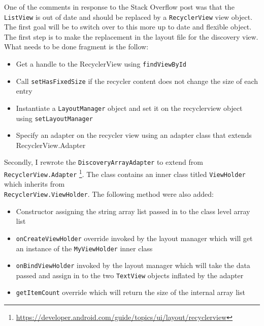 \documentclass[fontsize=11pt, %
                             paper=a4, %
                             twoside, %
                             captions=tableheading,
                             index=totoc,
                             hyperref]{labbook}
\begin{document}
\begin{addmargin}[0cm]{0cm}
One of the comments in response to the Stack Overflow post was that the \texttt{ListView} is out of date and should be replaced by a \texttt{RecyclerView} view object. The first goal will be to switch over to this more up to date and flexible object. The first step is to make the replacement in the layout file for the discovery view. What needs to be done fragment is the follow:
\begin{itemize}
\item Get a handle to the RecyclerView using \texttt{findViewById}
\item Call \texttt{setHasFixedSize} if the recycler content does not change the size of each entry
\item Instantiate a \texttt{LayoutManager} object and set it on the recyclerview object using \texttt{setLayoutManager}
\item Specify an adapter on the recycler view using an adapter class that extends RecyclerView.Adapter
\end{itemize}
Secondly, I rewrote the \texttt{DiscoveryArrayAdapter} to extend from \texttt{RecyclerView.Adapter} \footnote{\url{https://developer.android.com/guide/topics/ui/layout/recyclerview}}. The class contains an inner class titled \texttt{ViewHolder} which inherits from\\
\texttt{RecyclerView.ViewHolder}. The following method were also added:
\begin{itemize}
\item Constructor assigning the string array list passed in to the class level array list
\item \texttt{onCreateViewHolder} override invoked by the layout manager which will get an instance of the \texttt{MyViewHolder} inner class
\item \texttt{onBindViewHolder} invoked by the layout manager which will take the data passed and assign in to the two \texttt{TextView} objects inflated by the adapter
\item \texttt{getItemCount} override which will return the size of the internal array list 
\end{itemize}


\end{addmargin}
\end{document}
